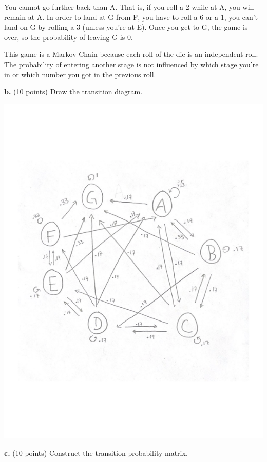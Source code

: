 \documentclass[
]{article}
\begin{document}
You cannot go further back than A. That is, if you roll a 2 while at A,
you will remain at A. In order to land at G from F, you have to roll a 6
or a 1, you can't land on G by rolling a 3 (unless you're at E). Once
you get to G, the game is over, so the probability of leaving G is 0.

This game is a Markov Chain because each roll of the die is an
independent roll. The probability of entering another stage is not
influenced by which stage you're in or which number you got in the
previous roll.

\textbf{b.} (10 points) Draw the transition diagram.

\includegraphics{./diagram.png}

\textbf{c.} (10 points) Construct the transition probability matrix.
\end{document}
